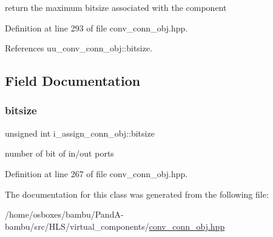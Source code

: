 return the maximum bitsize associated with the component 



Definition at line 293 of file conv\+\_\+conn\+\_\+obj.\+hpp.



References uu\+\_\+conv\+\_\+conn\+\_\+obj\+::bitsize.



\subsection{Field Documentation}
\mbox{\label{classi__assign__conn__obj_a7b6edcc112fc8f747611f012ae2b2605}} 
\subsubsection{\texorpdfstring{bitsize}{bitsize}}
{\footnotesize\ttfamily unsigned int i\+\_\+assign\+\_\+conn\+\_\+obj\+::bitsize\hspace{0.3cm}{\ttfamily [private]}}



number of bit of in/out ports 



Definition at line 267 of file conv\+\_\+conn\+\_\+obj.\+hpp.



The documentation for this class was generated from the following file\+:\begin{DoxyCompactItemize}
\item 
/home/osboxes/bambu/\+Pand\+A-\/bambu/src/\+H\+L\+S/virtual\+\_\+components/\hyperlink{conv__conn__obj_8hpp}{conv\+\_\+conn\+\_\+obj.\+hpp}\end{DoxyCompactItemize}
